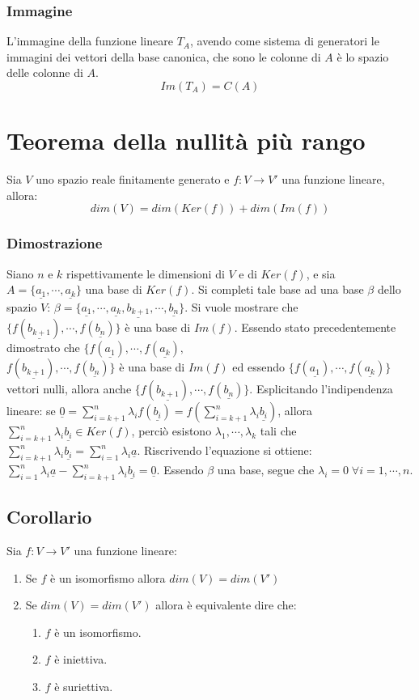 \subsubsection{Immagine}
L'immagine della funzione lineare $T_A$, avendo come sistema di generatori le immagini dei vettori della base canonica, che sono le colonne di $A$ \`e lo spazio delle colonne di 
$A$.
\begin{equation}
Im(T_A)=C(A)
\end{equation}
\section{Teorema della nullit\`a pi\`u rango}
Sia $V$ uno spazio reale finitamente generato e $f:V\rightarrow V'$ una funzione lineare, allora:
\begin{equation}
dim(V)=dim(Ker(f))+dim(Im(f))
\end{equation}
\subsubsection{Dimostrazione}
Siano $n$ e $k$ rispettivamente le dimensioni di $V$ e di $Ker(f)$, e sia $A=\{\underline{a_1},\cdots,\underline{a_k}\}$ una base di $Ker(f)$. Si completi tale base ad una base 
$\beta$ dello spazio $V$: $\beta=\{\underline{a_1},\cdots,\underline{a_k}, \underline{b_{k+1}},\cdots,\underline{b_n}\}$. Si vuole mostrare che $\{f(\underline{b_{k+1}}),\cdots,
f(\underline{b_n})\}$ \`e una base di $Im(f)$. Essendo stato precedentemente dimostrato che $\{f(\underline{a_1}),\cdots,f(\underline{a_k}),$ \\
$f(\underline{b_{k+1}}),\cdots,f(\underline{b_n})\}$ \`e una base di $Im(f)$ ed essendo $\{f(\underline{a_1}),\cdots,f(\underline{a_k})\}$ vettori nulli, allora anche $
\{f(\underline{b_{k+1}}),\cdots,f(\underline{b_n})\}$. Esplicitando l'indipendenza lineare: se $\underline{0}=\sum\limits_{i=k+1}^n\lambda_i f(\underline{b_i})=f(\sum\limits_{i=k
+1}^n \lambda_i\underline{b_i})$, allora $\sum\limits_{i=k+1}^n\lambda_i \underline{b_i}\in Ker(f)$, perci\`o esistono $\lambda_1,\cdots,\lambda_k$ tali che $\sum\limits_{i=k+1}
^n\lambda_i \underline{b_i}=\sum\limits_{i=1}^n\lambda_i\underline{a}$. Riscrivendo l'equazione si ottiene:$\sum\limits_{i=1}^n\lambda_i\underline{a}-\sum\limits_{i=k+1}^n
\lambda_i\underline{b_i}=\underline{0}$. Essendo $\beta$ una base, segue che $\lambda_i=0\;\forall i=1,\cdots,n$.
\subsection{Corollario}
Sia $f:V\rightarrow V'$ una funzione lineare:
\begin{enumerate}
\item Se $f$ \`e un isomorfismo allora $dim(V)=dim(V')$
\item Se $dim(V)=dim(V')$ allora \`e equivalente dire che:
\begin{enumerate}
\item $f$ \`e un isomorfismo.
\item $f$ \`e iniettiva.
\item $f$ \`e suriettiva.
\end{enumerate}
\end{enumerate}
